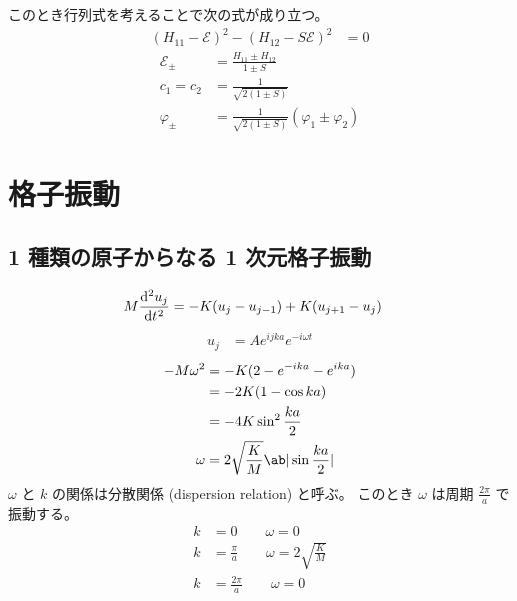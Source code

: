 \documentclass[uplatex,dvipdfmx,a4paper,11pt]{jlreq}
\numberwithin{equation}{section}
\theoremstyle{definition}
\begin{document}
このとき行列式を考えることで次の式が成り立つ。
\begin{align}
  (H_{11} - \mathcal{E})^2 - (H_{12} - S\mathcal{E})^2 & = 0
\end{align}
\begin{align}
  \mathcal{E}_\pm & = \frac{H_{11} \pm H_{12}}{1 \pm S}                    \\
  c_1 = c_2       & = \frac{1}{\sqrt{2(1 \pm S)}}                          \\
  \varphi_\pm     & = \frac{1}{\sqrt{2(1 \pm S)}}(\varphi_1 \pm \varphi_2)
\end{align}


\section{格子振動}
\subsection{1 種類の原子からなる 1 次元格子振動}
\begin{align}
  M\diff[2]{u_j}{t} & = -K(u_j - u_{j-1}) + K(u_{j+1} - u_j)
\end{align}
\begin{align}
  u_j & = Ae^{ijka}e^{-i\omega t}
\end{align}
\begin{align}
  -M\omega^2 & = -K(2 - e^{-ika} - e^{ika})               \\
             & = -2K(1 - \cos ka)                         \\
             & = -4K\sin^2\frac{ka}{2}                    \\
  \omega     & = 2\sqrt{\frac{K}{M}}\ab|\sin\frac{ka}{2}|
\end{align}
$\omega$ と $k$ の関係は分散関係 (dispersion relation) と呼ぶ。
このとき $\omega$ は周期 $\frac{2\pi}{a}$ で振動する。
\begin{align}
  k & = 0 \qquad \omega = 0                               \\
  k & = \frac{\pi}{a} \qquad \omega = 2\sqrt{\frac{K}{M}} \\
  k & = \frac{2\pi}{a} \qquad \omega = 0
\end{align}
\end{document}

